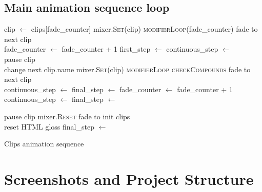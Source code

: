 \documentclass[12pt]{ociamthesis}  %
\newcommand*\func{\textsc}
\newcommand*\Let[2]{\State #1 $\gets$ #2}
\begin{document}
{\section{Main animation sequence loop}
\label{appendix:loop}
\begin{minipage}{1\linewidth}
\begin{algorithm}[H]
\small
	\begin{algorithmic}[1]
		\State
			\Let{clip}{clips[fade\_counter]}
				\State mixer.\func{Set}(clip)
				\State \func{modifierLoop}(fade\_counter)\label{line:modcall}
				\State fade to next clip
				\\
				\Let{fade\_counter}{fade\_counter + 1}
				\Let{first\_step}{\False}
				\Let{continuous\_step}{\True}
				\\
			\EndIf
						\State pause clip
						\\
							\State change next clip.name
						\EndIf
						\State mixer.\func{Set}(clip)
						\State \func{modifierLoop}
						\State \func{checkCompounds}
						\State fade to next clip
						\\
							\Let{continuous\_step}{\False}
							\Let{final\_step}{\True}
						\EndIf
						\Let{fade\_counter}{fade\_counter + 1}
					\EndIf
				\Else				
					\Let{continuous\_step}{\False}
					\Let{final\_step}{\True}
				\EndIf
				
			\EndIf
					\State pause clip
					\State mixer.\func{Reset}
					\State fade to init clips
					\\
					\State reset HTML gloss
					\Let{final\_step}{\False}
				\EndIf
			\EndIf
		\EndFunction
	\end{algorithmic}
	\caption{Clips animation sequence}
	\label{alg:sequence}
\end{algorithm}
\end{minipage}

\chapter{Screenshots and Project Structure}
\label{appendix:misc}
	
}
\end{document}
